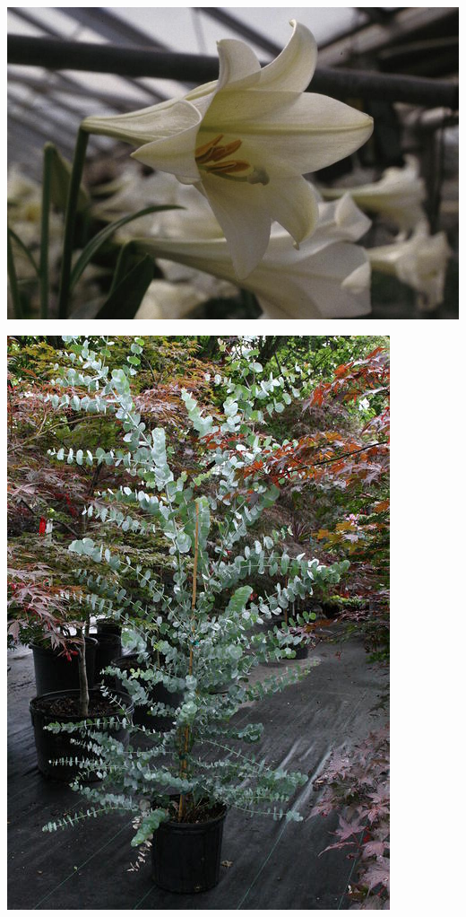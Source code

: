 \documentclass{article}
\begin{document}
\begin{center}
\includegraphics[width=0.9\textheight, angle=90]{../EasterLily_trumpet.jpg}
\end{center}
\newpage

\begin{center}
\includegraphics[width=0.9\textheight, angle=90]{../Eucalyptus-pot.jpg}
\end{center}
\newpage
\end{document}
